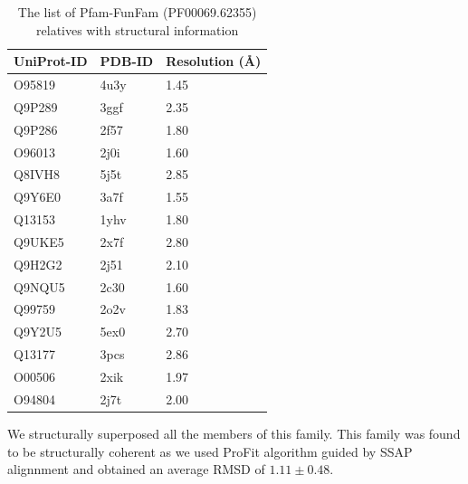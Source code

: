 \documentclass[a4paper, 11pt]{article}
\begin{document}
\begin{table}[H]
\centering
\caption{The list of Pfam-FunFam (PF00069.62355) relatives with structural information}
\label{pfam-62355}
\begin{tabular}{|l|l|l|}
\hline
UniProt-ID & PDB-ID & Resolution (Å) \\ \hline
O95819     & 4u3y   & 1.45           \\ \hline
Q9P289     & 3ggf   & 2.35           \\ \hline
Q9P286     & 2f57   & 1.80           \\ \hline
O96013     & 2j0i   & 1.60           \\ \hline
Q8IVH8     & 5j5t   & 2.85           \\ \hline
Q9Y6E0     & 3a7f   & 1.55           \\ \hline
Q13153     & 1yhv   & 1.80           \\ \hline
Q9UKE5     & 2x7f   & 2.80           \\ \hline
Q9H2G2     & 2j51   & 2.10           \\ \hline
Q9NQU5     & 2c30   & 1.60           \\ \hline
Q99759     & 2o2v   & 1.83           \\ \hline
Q9Y2U5     & 5ex0   & 2.70           \\ \hline
Q13177     & 3pcs   & 2.86           \\ \hline
O00506     & 2xik   & 1.97           \\ \hline
O94804     & 2j7t   & 2.00           \\ \hline
\end{tabular}
\end{table}
We structurally superposed all the members of this family. This family was found to be structurally coherent as we used ProFit algorithm guided by SSAP alignnment and obtained an average RMSD of $1.11 \pm 0.48$. 
\end{document}

